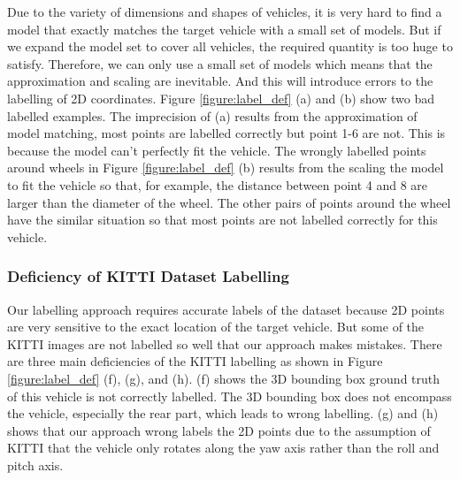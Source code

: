 \documentclass[a4paper,12pt]{article}
\begin{document}
Due to the variety of dimensions and shapes of vehicles, it is very hard to find a model that exactly matches the target vehicle with a small set of models. But if we expand the model set to cover all vehicles, the required quantity is too huge to satisfy. Therefore, we can only use a small set of models which means that the approximation and scaling are inevitable. And this will introduce errors to the labelling of 2D coordinates. Figure \ref{figure:label_def} (a) and (b) show two bad labelled examples. The imprecision of (a) results from the approximation of model matching, \ie most points are labelled correctly but point 1-6 are not. This is because the model can't perfectly fit the vehicle. The wrongly labelled points around wheels in Figure \ref{figure:label_def} (b) results from the scaling the model to fit the vehicle so that, for example, the distance between point 4 and 8 are larger than the diameter of the wheel. The other pairs of points around the wheel have the similar situation so that most points are not labelled correctly for this vehicle.

\subsubsection{Deficiency of KITTI Dataset Labelling}
Our labelling approach requires accurate labels of the dataset because 2D points are very sensitive to the exact location of the target vehicle. But some of the KITTI images are not labelled so well that our approach makes mistakes. There are three main deficiencies of the KITTI labelling as shown in Figure \ref{figure:label_def} (f), (g), and (h). (f) shows the 3D bounding box ground truth of this vehicle is not correctly labelled. The 3D bounding box does not encompass the vehicle, especially the rear part, which leads to wrong labelling. (g) and (h) shows that our approach wrong labels the 2D points due to the assumption of KITTI that the vehicle only rotates along the yaw axis rather than the roll and pitch axis.
\end{document}
